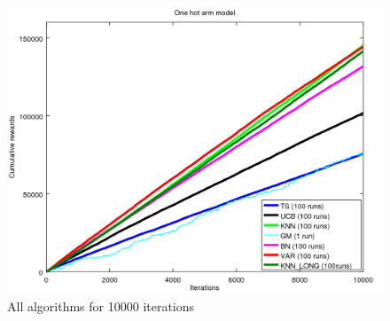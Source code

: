 \documentclass{article} %
\begin{document}
\begin{figure}[h]
	\begin{center}
		\includegraphics[width=1.0\textwidth]{all_10000it.png}
	\end{center}
	\caption{All algorithms for 10000 iterations}
\end{figure}
\end{document}
